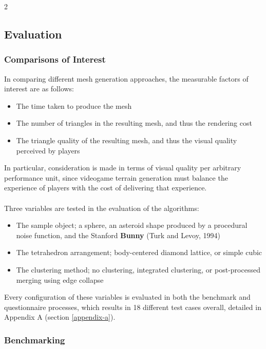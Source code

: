 \documentclass[]{article}
\providecommand{\tightlist}{%
  \setlength{\itemsep}{0pt}\setlength{\parskip}{0pt}}
\begin{document}
\FloatBarrier
\begin{multicols}{2}

\subsection{Evaluation}\label{evaluation}

\subsubsection{Comparisons of Interest}\label{comparisons-of-interest}

In comparing different mesh generation approaches, the measurable factors of interest are as follows:
\begin{itemize}
\tightlist
\item The time taken to produce the mesh
\item The number of triangles in the resulting mesh, and thus the rendering cost
\item The triangle quality of the resulting mesh, and thus the visual quality perceived by players
\end{itemize}
In particular, consideration is made in terms of visual quality per arbitrary performance unit, since videogame terrain generation must balance the experience of players with the cost of delivering that experience.
\\
\\
Three variables are tested in the evaluation of the algorithms:
\begin{itemize}
\tightlist
\item The sample object; a sphere, an asteroid shape produced by a procedural noise function, and the Stanford \textbf{Bunny} (Turk and Levoy, 1994)
\item The tetrahedron arrangement; body-centered diamond lattice, or simple cubic
\item The clustering method; no clustering, integrated clustering, or post-processed merging using edge collapse
\end{itemize}
Every configuration of these variables is evaluated in both the benchmark and questionnaire processes, which results in 18 different test cases overall, detailed in Appendix A (section \ref{appendix-a}).

\subsubsection{Benchmarking}\label{benchmarking}


\end{multicols}
\end{document}
